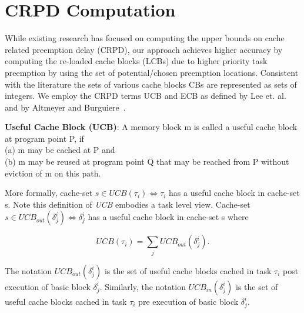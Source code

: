 \section{CRPD Computation}\label{sec:crpd_computation}

While existing research has focused on computing the upper bounds on cache related preemption delay (CRPD), our approach achieves higher accuracy by computing the re-loaded cache blocks (LCBs) due to higher priority task preemption by using the set of potential/chosen preemption locations.  Consistent with the literature the sets of various cache blocks CBs are represented as sets of integers.  We employ the CRPD terms UCB and ECB as defined by Lee et. al.~\cite{lee:98} and by Altmeyer and Burguiere~\cite{altmeyer:11c}.

\begin{definition}
\textbf{Useful Cache Block (UCB)}: A memory block m is called a useful cache block at program point P, if \\(a) m may be cached at P and \\(b) m may be reused at program point Q that may be reached from P without eviction of m on this path.
\end{definition}

\noindent More formally, cache-set \begin{math}s \in \textit{UCB}(\tau_{i}) \Leftrightarrow \tau_{i}\end{math} has a useful cache block in cache-set s.  Note this definition of \textit{UCB} embodies a task level view.  Cache-set \begin{math}s \in \textit{UCB}_{out}(\delta_{j}^{i}) \Leftrightarrow \delta_{j}^{i}\end{math} has a useful cache block in cache-set s where

\begin{equation}\label{eqn:ucb-task}
    \textit{UCB}(\tau_{i}) = \sum_{j} \textit{UCB}_{out}(\delta_{j}^{i}).
\end{equation}

\noindent The notation \begin{math}\textit{UCB}_{out}(\delta_{j}^{i})\end{math} is the set of useful cache blocks cached in task \begin{math}\tau_{i}\end{math} post execution of basic block \begin{math}\delta_{j}^{i}\end{math}.  Similarly, the notation \begin{math}\textit{UCB}_{in}(\delta_{j}^{i})\end{math} is the set of useful cache blocks cached in task \begin{math}\tau_{i}\end{math} pre execution of basic block \begin{math}\delta_{j}^{i}\end{math}.

